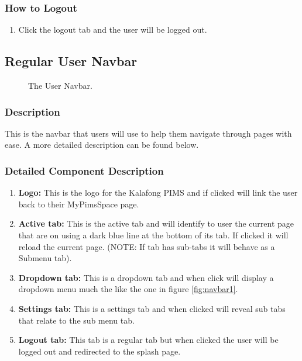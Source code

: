 \documentclass[14pt, a4paper]{article}
\begin{document}
\subsubsection{How to Logout}
\begin{enumerate}
\item Click the logout tab and the user will be logged out.
\end{enumerate}
\subsection {Regular User Navbar}
\begin{figure}[H]
\caption{The User Navbar.}
\label{fig:navbar4}
\end{figure}
\subsubsection{Description} This is the navbar that users will use to help them navigate through pages with ease. A more detailed description can be found below.
\subsubsection{Detailed Component Description}
\begin{enumerate}
\item \textbf{Logo:} This is the logo for the Kalafong PIMS and if clicked will link the user back to their MyPimsSpace page.
\item \textbf{Active tab:} This is the active tab and will identify to user the current page that are on using a dark blue line at the bottom of its tab. If clicked it will reload the current page. (NOTE: If tab has sub-tabs it will behave as a Submenu tab).
\item \textbf{Dropdown tab: } This is a dropdown tab and when click will display a dropdown menu much the like the one in figure \ref{fig:navbar1}.
\item \textbf{Settings tab:} This is a settings tab and when clicked will reveal sub tabs that relate to the sub menu tab.
\item \textbf{Logout tab:} This tab is a regular tab but when clicked the user will be logged out and redirected to the splash page.
\end{enumerate}
\end{document}
